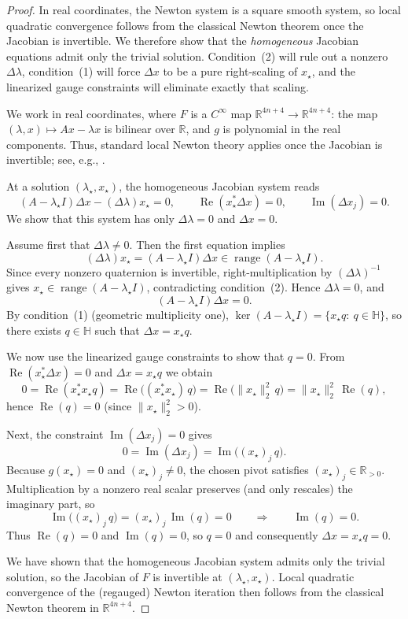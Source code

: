 \documentclass[preprint,12pt]{elsarticle}  %
\theoremstyle{definition}
\theoremstyle{definition}
\theoremstyle{definition}
\theoremstyle{definition}
\theoremstyle{definition}
\theoremstyle{remark}
\theoremstyle{remark}
\theoremstyle{remark}
\renewcommand{\Re}{\operatorname{Re}}
\renewcommand{\Im}{\operatorname{Im}}
\newcommand{\RR}{\mathbb{R}}
\newcommand{\HH}{\mathbb{H}}
\DeclareMathOperator{\Range}{range}
\begin{document}
\begin{proof}
In real coordinates, the Newton system is a square smooth system, so local quadratic convergence follows
from the classical Newton theorem once the Jacobian is invertible.  We therefore show that the \emph{homogeneous} Jacobian
equations admit only the trivial solution.  Condition~(2) will rule out a nonzero $\Delta\lambda$, condition~(1) will force
$\Delta x$ to be a pure right-scaling of $x_\star$, and the linearized gauge constraints will eliminate exactly that scaling.

We work in real coordinates, where $F$ is a $C^\infty$ map $\RR^{4n+4}\to\RR^{4n+4}$: the map
$(\lambda,x)\mapsto Ax-\lambda x$ is bilinear over $\RR$, and $g$ is polynomial in the real components.
Thus, standard local Newton theory applies once the Jacobian is invertible; see, e.g.,
\cite{OrtegaRheinboldt2000,Deuflhard2011,DennisSchnabel1996}.

At a solution $(\lambda_\star,x_\star)$, the homogeneous Jacobian system reads
\[
(A-\lambda_\star I)\Delta x-(\Delta\lambda)x_\star=0,\qquad
\Re(x_\star^\ast\Delta x)=0,\qquad \Im(\Delta x_j)=0.
\]
We show that this system has only $\Delta\lambda=0$ and $\Delta x=0$.

Assume first that $\Delta\lambda\neq 0$.  Then the first equation implies
\[
(\Delta\lambda)x_\star=(A-\lambda_\star I)\Delta x\in \Range(A-\lambda_\star I).
\]
Since every nonzero quaternion is invertible, right-multiplication by $(\Delta\lambda)^{-1}$ gives
$x_\star\in \Range(A-\lambda_\star I)$, contradicting condition~(2).  Hence $\Delta\lambda=0$, and
\[
(A-\lambda_\star I)\Delta x=0.
\]
By condition~(1) (geometric multiplicity one), $\ker(A-\lambda_\star I)=\{x_\star q:\ q\in\HH\}$, so there exists
$q\in\HH$ such that $\Delta x=x_\star q$.

We now use the linearized gauge constraints to show that $q=0$.
From $\Re(x_\star^\ast\Delta x)=0$ and $\Delta x=x_\star q$ we obtain
\[
0=\Re(x_\star^\ast x_\star q)=\Re\bigl((x_\star^\ast x_\star)\,q\bigr)
=\Re\bigl(\|x_\star\|_2^2\,q\bigr)
=\|x_\star\|_2^2\,\Re(q),
\]
hence $\Re(q)=0$ (since $\|x_\star\|_2^2>0$).

Next, the constraint $\Im(\Delta x_j)=0$ gives
\[
0=\Im(\Delta x_j)=\Im\bigl((x_\star)_j\,q\bigr).
\]
Because $g(x_\star)=0$ and $(x_\star)_j\neq 0$, the chosen pivot satisfies $(x_\star)_j\in\RR_{>0}$.
Multiplication by a nonzero real scalar preserves (and only rescales) the imaginary part, so
\[
\Im\bigl((x_\star)_j\,q\bigr)=(x_\star)_j\,\Im(q)=0
\qquad\Longrightarrow\qquad \Im(q)=0.
\]
Thus $\Re(q)=0$ and $\Im(q)=0$, so $q=0$ and consequently $\Delta x=x_\star q=0$.

We have shown that the homogeneous Jacobian system admits only the trivial solution, so the Jacobian of $F$ is invertible at
$(\lambda_\star,x_\star)$. Local quadratic convergence of the (regauged) Newton iteration then follows from the classical
Newton theorem in $\RR^{4n+4}$.
\end{proof}
\end{document}
